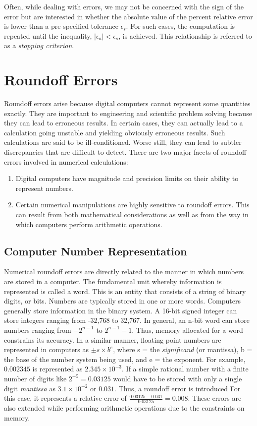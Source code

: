 \documentclass[book.tex]{subfiles}
\begin{document}
Often, while dealing with errors, we may not be concerned with the sign of the error but are interested in whether the absolute value of the percent relative error is lower than a pre-specified tolerance $\epsilon_s$. For such cases, the computation is repeated until the inequality, $|\epsilon_a| < \epsilon_s $, is achieved. This relationship is referred to as a \textit{stopping criterion}.

\section{Roundoff Errors}

Roundoff errors arise because digital computers cannot represent some quantities exactly. They are important to engineering and scientific problem solving because they can lead to erroneous results. In certain cases, they can actually lead to a calculation going unstable and yielding obviously erroneous results. Such calculations are said to be ill-conditioned. Worse still, they can lead to subtler discrepancies that are difficult to detect. There are two major facets of roundoff errors involved in numerical calculations:

\begin{enumerate}
	\itemsep -3pt
	\item Digital computers have magnitude and precision limits on their ability to represent numbers.
	\item Certain numerical manipulations are highly sensitive to roundoff errors. This can result from both mathematical considerations as well as from the way in which computers perform arithmetic operations.
\end{enumerate}
\subsection{Computer Number Representation}

Numerical roundoff errors are directly related to the manner in which numbers are stored in a computer. The fundamental unit whereby information is represented is called a word. This is an entity that consists of a string of binary digits, or bits. Numbers are typically stored in one or more words. Computers generally store information in the binary system. A 16-bit signed integer can store integers ranging from -32,768 to 32,767. In general, an n-bit word can store numbers ranging from $-2^{n-1}$ to $2^{n-1}-1$. Thus, memory allocated for a word constrains its accuracy. In a similar manner, floating point numbers are represented in computers as $	\pm s \times  b^e$, where s = the \textit{significand} (or mantissa), b = the base of the number system being used, and e = the exponent. For example, $0.002345$ is represented as $2.345\times10^{-3}$. If a simple rational number with a finite number of digits like $2^{-5} = 0.03125$ would have to be stored with only a single digit \textit{mantissa} as $3.1 \times 10^{-2}$ or $0.031$. Thus, a roundoff error is introduced  For this case, it represents a relative error of $\frac{0.03125-0.031}{0.03125} = 0.008$. These errors are also extended while performing arithmetic operations due to the constraints on memory.
 
\end{document}
